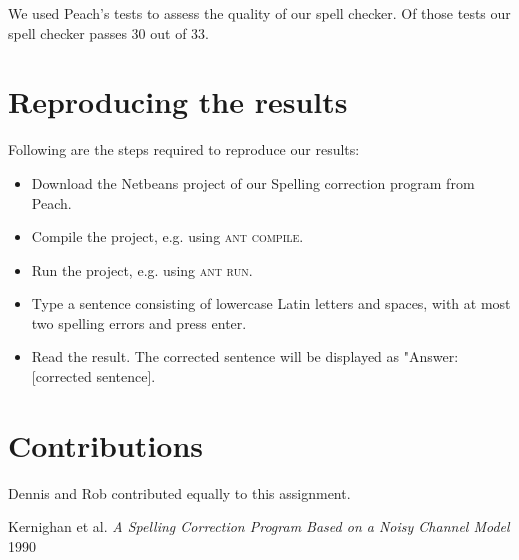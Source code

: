 \documentclass[11pt,a4paper]{article}
\begin{document}
We used Peach's tests to assess the quality of our spell checker. Of those tests our spell checker passes 30 out of 33.

\section{Reproducing the results}
Following are the steps required to reproduce our results:
\begin{itemize}
\item Download the Netbeans project of our Spelling correction program from Peach.
\item Compile the project, e.g. using \textsc{ant compile}.
\item Run the project, e.g. using \textsc{ant run}.
\item Type a sentence consisting of lowercase Latin letters and spaces, with at most two spelling errors and press enter.
\item Read the result. The corrected sentence will be displayed as "Answer: [corrected sentence].
\end{itemize}

\section{Contributions}
Dennis and Rob contributed equally to this assignment.

\begin{thebibliography}{9}
	Kernighan et al.
	\emph{A Spelling Correction Program Based on a Noisy Channel Model}
	1990
\end{thebibliography}
\end{document}
